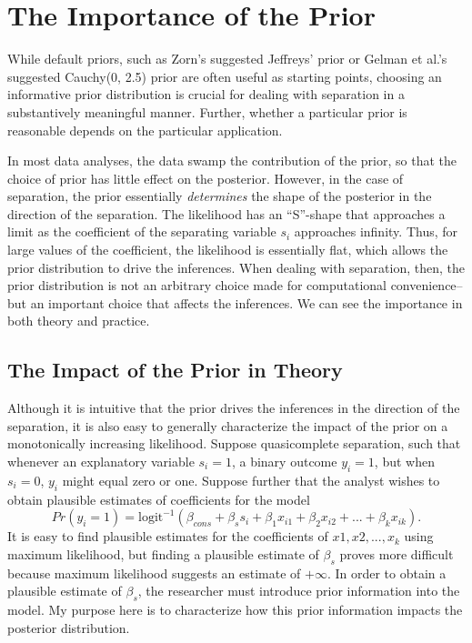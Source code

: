 \documentclass[12pt]{article}
\begin{document}
\section*{The Importance of the Prior}

While default priors, such as Zorn's suggested Jeffreys' prior or Gelman et al.'s suggested Cauchy(0, 2.5) prior are often useful as starting points, choosing an informative prior distribution is crucial for dealing with separation in a substantively meaningful manner. 
Further, whether a particular prior is reasonable depends on the particular application.

In most data analyses, the data swamp the contribution of the prior, so that the choice of prior has little effect on the posterior. 
However, in the case of separation, the prior essentially \emph{determines} the shape of the posterior in the direction of the separation. 
The likelihood has an ``S''-shape that approaches a limit as the coefficient of the separating variable $s_i$ approaches infinity. 
Thus, for large values of the coefficient, the likelihood is essentially flat, which allows the prior distribution to drive the inferences. 
When dealing with separation, then, the prior distribution is not an arbitrary choice made for computational convenience--but an important choice that affects the inferences. 
We can see the importance in both theory and practice.

\subsection*{The Impact of the Prior in Theory}

Although it is intuitive that the prior drives the inferences in the direction of the separation, it is also easy to generally characterize the impact of the prior on a monotonically increasing likelihood. 
Suppose quasicomplete separation, such that whenever an explanatory variable $s_i = 1$, a binary outcome $y_i = 1$, but when $s_i = 0$, $y_i$ might equal zero or one. 
Suppose further that the analyst wishes to obtain plausible estimates of coefficients for the model
\begin{equation*}
Pr(y_i =1) = \text{logit}^{-1}(\beta_{cons} + \beta_s s_i +  \beta_1 x_{i1} + \beta_2 x_{i2} + ... + \beta_k x_{ik}). 
\end{equation*}
\noindent It is easy to find plausible estimates for the coefficients of $x1, x2, ..., x_k$ using maximum likelihood, but finding a plausible estimate of $\beta_{s}$ proves more difficult because maximum likelihood suggests an estimate of $+\infty$. 
In order to obtain a plausible estimate of $\beta_{s}$, the researcher must introduce prior information into the model. 
My purpose here is to characterize how this prior information impacts the posterior distribution.
\end{document}
